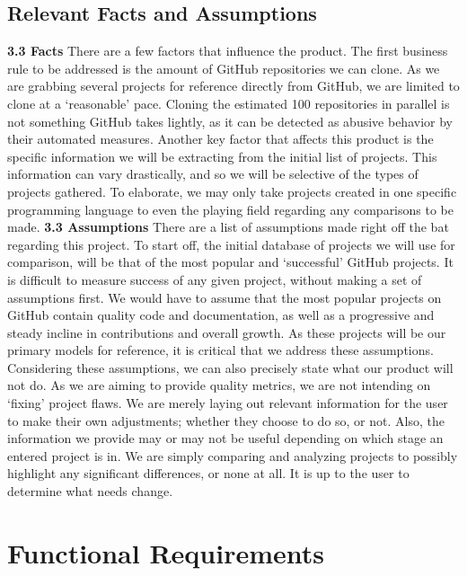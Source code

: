 \documentclass{article}
\begin{document}
\subsection{Relevant Facts and Assumptions}
\textbf{3.3 Facts}
\newline
There are a few factors that influence the product. The first business rule to be addressed is the amount of GitHub repositories we can clone. As we are grabbing several projects for reference directly from GitHub, we are limited to clone at a ‘reasonable’ pace. Cloning the estimated 100 repositories in parallel is not something GitHub takes lightly, as it can be detected as abusive behavior by their automated measures. Another key factor that affects this product is the specific information we will be extracting from the initial list of projects. This information can vary drastically, and so we will be selective of the types of projects gathered. To elaborate, we may only take projects created in one specific programming language to even the playing field regarding any comparisons to be made.
\newline
\newline 
\textbf{3.3 Assumptions}
\newline
There are a list of assumptions made right off the bat regarding this project. To start off, the initial database of projects we will use for comparison, will be that of the most popular and ‘successful’ GitHub projects. It is difficult to measure success of any given project, without making a set of assumptions first. We would have to assume that the most popular projects on GitHub contain quality code and documentation, as well as a progressive and steady incline in contributions and overall growth. As these projects will be our primary models for reference, it is critical that we address these assumptions.
Considering these assumptions, we can also precisely state what our product will not do. As we are aiming to provide quality metrics, we are not intending on ‘fixing’ project flaws. We are merely laying out relevant information for the user to make their own adjustments; whether they choose to do so, or not. Also, the information we provide may or may not be useful depending on which stage an entered project is in. We are simply comparing and analyzing projects to possibly highlight any significant differences, or none at all. It is up to the user to determine what needs change. 

\newpage
\section{Functional Requirements}
\end{document}
